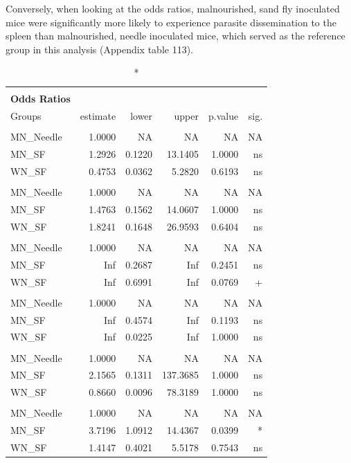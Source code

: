 \documentclass[
  12pt,
  letterpaper,
]{article}
\begin{document}
Conversely, when looking at the odds ratios, malnourished, sand fly inoculated mice were significantly more likely to experience parasite dissemination to the spleen than malnourished, needle inoculated mice, which served as the reference group in this analysis (Appendix table 113).

\begingroup
\fontsize{12.0pt}{14.4pt}\selectfont
\begin{longtable}{l|rrrrr}
\caption*{
{\large \textbf{Appendix Table 113}} \\ 
{\small \textbf{Odds Ratios}}
} \\ 
\toprule
Groups & {estimate} & {lower} & {upper} & {p.value} & {sig.} \\ 
\midrule\addlinespace[2.5pt]
\multicolumn{6}{l}{Brain} \\[2.5pt] 
\midrule\addlinespace[2.5pt]
MN\_Needle & 1.0000 & NA & NA & NA & NA \\ 
MN\_SF & 1.2926 & 0.1220 & 13.1405 & 1.0000 & ns \\ 
WN\_SF & 0.4753 & 0.0362 & 5.2820 & 0.6193 & ns \\ 
\midrule\addlinespace[2.5pt]
\multicolumn{6}{l}{Ear} \\[2.5pt] 
\midrule\addlinespace[2.5pt]
MN\_Needle & 1.0000 & NA & NA & NA & NA \\ 
MN\_SF & 1.4763 & 0.1562 & 14.0607 & 1.0000 & ns \\ 
WN\_SF & 1.8241 & 0.1648 & 26.9593 & 0.6404 & ns \\ 
\midrule\addlinespace[2.5pt]
\multicolumn{6}{l}{Eye} \\[2.5pt] 
\midrule\addlinespace[2.5pt]
MN\_Needle & 1.0000 & NA & NA & NA & NA \\ 
MN\_SF & Inf & 0.2687 & Inf & 0.2451 & ns \\ 
WN\_SF & Inf & 0.6991 & Inf & 0.0769 & + \\ 
\midrule\addlinespace[2.5pt]
\multicolumn{6}{l}{Liver} \\[2.5pt] 
\midrule\addlinespace[2.5pt]
MN\_Needle & 1.0000 & NA & NA & NA & NA \\ 
MN\_SF & Inf & 0.4574 & Inf & 0.1193 & ns \\ 
WN\_SF & Inf & 0.0225 & Inf & 1.0000 & ns \\ 
\midrule\addlinespace[2.5pt]
\multicolumn{6}{l}{Paw} \\[2.5pt] 
\midrule\addlinespace[2.5pt]
MN\_Needle & 1.0000 & NA & NA & NA & NA \\ 
MN\_SF & 2.1565 & 0.1311 & 137.3685 & 1.0000 & ns \\ 
WN\_SF & 0.8660 & 0.0096 & 78.3189 & 1.0000 & ns \\ 
\midrule\addlinespace[2.5pt]
\multicolumn{6}{l}{Spleen} \\[2.5pt] 
\midrule\addlinespace[2.5pt]
MN\_Needle & 1.0000 & NA & NA & NA & NA \\ 
MN\_SF & 3.7196 & 1.0912 & 14.4367 & 0.0399 & * \\ 
WN\_SF & 1.4147 & 0.4021 & 5.5178 & 0.7543 & ns \\ 
\bottomrule
\end{longtable}
\endgroup
\end{document}
